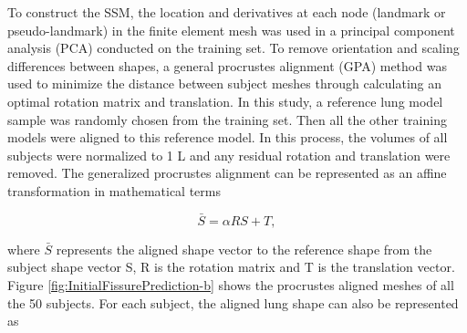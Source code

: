 \documentclass[]{spie}  %
\begin{document}
{%
%

To construct the SSM, the location and derivatives at each node (landmark or pseudo-landmark) in the finite element mesh was used in a principal component analysis (PCA) conducted on the training set. To remove orientation and scaling differences between shapes, a general procrustes alignment (GPA) method was used to minimize the distance between subject meshes through calculating an optimal rotation matrix and translation. In this study, a reference lung model sample was randomly chosen from the training set. Then all the other training models were aligned to this reference model. In this process, the volumes of all subjects were normalized to 1 L and any residual rotation and translation were removed. The generalized procrustes alignment can be represented as an affine transformation in mathematical terms

\begin{equation}
 \label{eq:PCAConstruction1}
 \bar{S} = \alpha RS + T,
\end{equation}

\noindent where $\bar{S}$ represents the aligned shape vector to the reference shape from the subject shape vector S, R is the rotation matrix and T is the translation vector. Figure \ref{fig:InitialFissurePrediction-b} shows the procrustes aligned meshes of all the 50 subjects. For each subject, the aligned lung shape can also be represented as 

}
\end{document}
